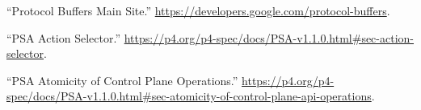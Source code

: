 \documentclass[11pt]{article}
\begin{document}
{{\begin{thebibliography}{36}
\mdbibitemlabel{{}[20]}\textquotedblleft{}Protocol Buffers Main Site.\textquotedblright{} \href{https://developers.google.com/protocol-buffers}{{\ttfamily https://\hspace{0pt}developers.\hspace{0pt}google.\hspace{0pt}com/\hspace{0pt}protocol-\hspace{0pt}buffers}}.\label{proto}%

\mdbibitemlabel{{}[21]}\textquotedblleft{}PSA Action Selector.\textquotedblright{} \href{https://p4.org/p4-spec/docs/PSA-v1.1.0.html\%23sec-action-selector}{{\ttfamily https://\hspace{0pt}p4.\hspace{0pt}org/\hspace{0pt}p4-\hspace{0pt}spec/\hspace{0pt}docs/\hspace{0pt}PSA-\hspace{0pt}v1.\hspace{0pt}1.\hspace{0pt}0.\hspace{0pt}html\#\hspace{0pt}sec-\hspace{0pt}action-\hspace{0pt}selector}}.\label{psaactionselector}%

\mdbibitemlabel{{}[22]}\textquotedblleft{}PSA Atomicity of Control Plane Operations.\textquotedblright{} \href{https://p4.org/p4-spec/docs/PSA-v1.1.0.html\%23sec-atomicity-of-control-plane-api-operations}{{\ttfamily https://\hspace{0pt}p4.\hspace{0pt}org/\hspace{0pt}p4-\hspace{0pt}spec/\hspace{0pt}docs/\hspace{0pt}PSA-\hspace{0pt}v1.\hspace{0pt}1.\hspace{0pt}0.\hspace{0pt}html\#\hspace{0pt}sec-\hspace{0pt}atomicity-\hspace{0pt}of-\hspace{0pt}control-\hspace{0pt}plane-\hspace{0pt}api-\hspace{0pt}operations}}.\label{psaatomicityofcontrolplaneops}%


\end{thebibliography}}}
\end{document}
